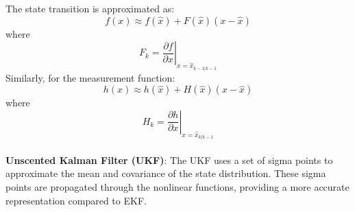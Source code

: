 The state transition is approximated as:
\begin{equation}
    f(x) \approx f(\hat{x}) + F(\hat{x})(x - \hat{x})
\end{equation}
where
\begin{equation}
    F_k = \left. \frac{\partial f}{\partial x} \right|_{x = \hat{x}_{k-1|k-1}}
\end{equation}
Similarly, for the measurement function:
\begin{equation}
    h(x) \approx h(\hat{x}) + H(\hat{x})(x - \hat{x})
\end{equation}
where
\begin{equation}
    H_k = \left. \frac{\partial h}{\partial x} \right|_{x = \hat{x}_{k|k-1}}
\end{equation}
\\
\textbf{Unscented Kalman Filter (UKF)}:
The UKF uses a set of sigma points to approximate the mean and covariance of the state distribution. These sigma points are propagated through the nonlinear functions, providing a more accurate representation compared to EKF.

